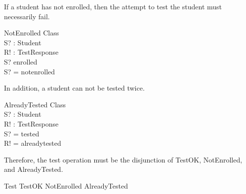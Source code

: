 \documentclass[letterpaper,11pt]{article}
\begin{document}
If a student has not enrolled, then the attempt to test the student must
necessarily fail.

    \begin{schema}{NotEnrolled}
    \Xi Class \\
    S? : Student \\
    R! : TestResponse \\
    \where
    S? \notin enrolled \\
    S? = notenrolled \\
    \end{schema}

In addition, a student can not be tested twice.

    \begin{schema}{AlreadyTested}
    \Xi Class \\
    S? : Student \\
    R! : TestResponse \\
    \where
    S? = tested \\
    R! = alreadytested \\
    \end{schema}

Therefore, the test operation must be the disjunction of TestOK, NotEnrolled,
and AlreadyTested.

    \begin{zed}
    Test \triangleq TestOK \vee NotEnrolled \vee AlreadyTested
    \end{zed}
\end{document}
